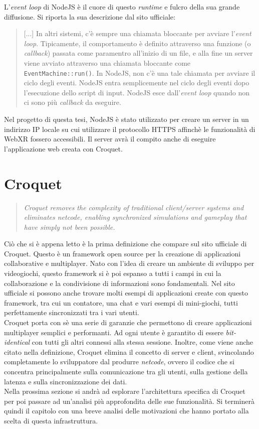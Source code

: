 L'\textit{event loop} di NodeJS è il cuore di questo \textit{runtime} e fulcro della sua grande diffusione. Si riporta la sua descrizione dal sito ufficiale\cite{NodeJS}:
\begin{quote}
    [...] In altri sistemi, c'è sempre una chiamata bloccante per avviare l'\textit{event loop}. Tipicamente, il comportamento è definito attraverso una funzione (o \textit{callback})
    passata come paramentro all'inizio di un file, e alla fine un server viene avviato attraverso una chiamata bloccante come \texttt{EventMachine::run()}. In NodeJS, non c'è una tale 
    chiamata per avviare il ciclo degli eventi. NodeJS entra semplicemente nel ciclo degli eventi dopo l'esecuzione dello script di input. NodeJS esce dall'\textit{event loop} quando 
    non ci sono più \textit{callback} da eseguire.
\end{quote}
Nel progetto di questa tesi, NodeJS è stato utilizzato per creare un server in un indirizzo IP locale su cui utilizzare il protocollo HTTPS affinchè le funzionalità di WebXR fossero
accessibili. Il server avrà il compito anche di eseguire l'applicazione web creata con Croquet.


\section{Croquet}\label{sec:Croquet}
\begin{quote}
    \textit{Croquet removes the complexity of traditional client/server systems and eliminates netcode, enabling synchronized simulations and gameplay that have simply not been 
    possible.}\cite{Croquet}
\end{quote}
Ciò che si è appena letto è la prima definizione che compare sul sito ufficiale di Croquet. Questo è un framework open source per la creazione di applicazioni 
collaborative e multiplayer. Nato con l'idea di creare un ambiente di sviluppo per videogiochi, questo framework si è poi espanso a tutti i campi in cui la collaborazione e 
la condivisione di informazioni sono fondamentali. Nel sito ufficiale si possono anche trovare molti esempi di applicazioni create con questo framework, tra cui un contatore, una 
chat e vari esempi di mini-giochi, tutti perfettamente sincronizzati tra i vari utenti.\\
\newline
Croquet porta con sè una serie di garanzie che permettono di creare applicazioni multiplayer semplici e performanti. Ad ogni utente
è garantito di essere \textit{bit-identical} con tutti gli altri connessi alla stessa sessione. Inoltre, come viene anche citato nella definizione, Croquet elimina il concetto
di server e client, svincolando completamente lo sviluppatore dal produrre \textit{netcode}, ovvero il codice che si concentra principalmente sulla comunicazione tra gli utenti,
sulla gestione della latenza e sulla sincronizzazione dei dati.\\ 
Nella prossima sezione si andrà ad esplorare l'architettura specifica di Croquet per poi passare ad un'analisi più approfondita delle sue funzionalità. Si terminerà quindi il capitolo
con una breve analisi delle motivazioni che hanno portato alla scelta di questa infrastruttura.\\

